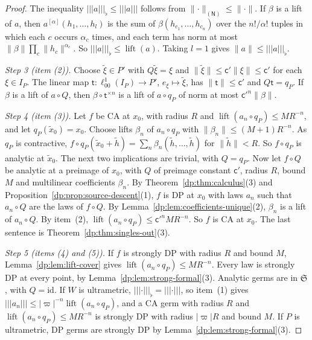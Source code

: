 \documentclass[11pt]{amsart}
\theoremstyle{definition}
\theoremstyle{remark}
\numberwithin{equation}{section}
\newcommand{\id}{\mathrm{id}}
\newcommand{\abs}[1]{\lvert #1\rvert}
\newcommand{\norm}[1]{\lVert #1\rVert}
\theoremstyle{plain}
\theoremstyle{definition}
\theoremstyle{plain}
\begin{document}
\begin{proof}
The inequality $\lvert\!\lvert\!\lvert a\rvert\!\rvert\!\rvert_\flat\le\lvert\!\lvert\!\lvert a\rvert\!\rvert\!\rvert$ follows from $\norm\cdot_{(\mathsf N)}\le\norm\cdot$. If $\beta$ is a lift of $a$, then $a^{[\alpha]}(h_1,\dots,h_l)$ is the sum of $\beta(h_{c_1},\dots,h_{c_n})$ over the $n!/\alpha!$ tuples in which each $c$ occurs $\alpha_c$ times, and each term has norm at most $\norm\beta\prod_c\norm{h_c}^{\alpha_c}$. So $\lvert\!\lvert\!\lvert a\rvert\!\rvert\!\rvert_\flat\le\operatorname{lift}(a)$. Taking $l=1$ gives $\norm a\le\lvert\!\lvert\!\lvert a\rvert\!\rvert\!\rvert_\flat$.

\emph{Step 3 (item (2)).} Choose $\tilde\xi\in P'$ with $Q\tilde\xi=\xi$ and $\norm{\tilde\xi}\le\mathsf c'\norm\xi\le\mathsf c'$ for each $\xi\in I_P$. The linear map $\mathsf t\colon\ell^1_{00}(I_P)\to P'$, $e_\xi\mapsto\tilde\xi$, has $\norm{\mathsf t}\le\mathsf c'$ and $Q\mathsf t=q_P$. If $\beta$ is a lift of $a\circ Q$, then $\beta\circ\mathsf t^{\times n}$ is a lift of $a\circ q_P$ of norm at most $\mathsf c'^n\norm\beta$.

\emph{Step 4 (item (3)).} Let $f$ be CA at $x_0$, with radius $R$ and $\operatorname{lift}(a_n\circ q_P)\le MR^{-n}$, and let $q_P(\tilde x_0)=x_0$. Choose lifts $\beta_n$ of $a_n\circ q_P$ with $\norm{\beta_n}\le(M+1)R^{-n}$. As $q_P$ is contractive, $f\circ q_P(\tilde x_0+\tilde h)=\sum_n\beta_n(\tilde h,\dots,\tilde h)$ for $\norm{\tilde h}<R$. So $f\circ q_P$ is analytic at $\tilde x_0$. The next two implications are trivial, with $Q=q_P$. Now let $f\circ Q$ be analytic at a preimage of $x_0$, with $Q$ of preimage constant $\mathsf c'$, radius $R$, bound $M$ and multilinear coefficients $\beta_n$. By Theorem~\ref{dp:thm:calculus}(3) and Proposition~\ref{dp:prop:source-descent}(1), $f$ is DP at $x_0$ with laws $a_n$ such that $a_n\circ Q$ are the laws of $f\circ Q$. By Lemma~\ref{dp:lem:coefficients-unique}(2), $\beta_n$ is a lift of $a_n\circ Q$. By item~(2), $\operatorname{lift}(a_n\circ q_P)\le\mathsf c'^nMR^{-n}$. So $f$ is CA at $x_0$. The last sentence is Theorem~\ref{dp:thm:singles-out}(3).

\emph{Step 5 (items (4) and (5)).} If $f$ is strongly DP with radius $R$ and bound $M$, Lemma~\ref{dp:lem:lift-cover} gives $\operatorname{lift}(a_n\circ q_P)\le MR^{-n}$. Every law is strongly DP at every point, by Lemma~\ref{dp:lem:strong-formal}(3). Analytic germs are in $\mathfrak S$, with $Q=\id$. If $W$ is ultrametric, $\lvert\!\lvert\!\lvert\cdot\rvert\!\rvert\!\rvert_\flat=\lvert\!\lvert\!\lvert\cdot\rvert\!\rvert\!\rvert$, so item~(1) gives $\lvert\!\lvert\!\lvert a_n\rvert\!\rvert\!\rvert\le\abs\varpi^{-n}\operatorname{lift}(a_n\circ q_P)$, and a CA germ with radius $R$ and $\operatorname{lift}(a_n\circ q_P)\le MR^{-n}$ is strongly DP with radius $\abs\varpi R$ and bound $M$. If $P$ is ultrametric, DP germs are strongly DP by Lemma~\ref{dp:lem:strong-formal}(3).


\end{proof}
\end{document}
